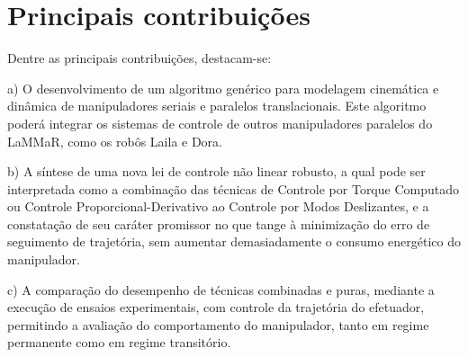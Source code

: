 \documentclass[]{politex}
\begin{document}

\section{Principais contribuições}

Dentre as principais contribuições, destacam-se:

a) O desenvolvimento de um algoritmo genérico para modelagem cinemática e dinâmica de manipuladores seriais e paralelos translacionais. Este algoritmo poderá integrar os sistemas de controle de outros manipuladores paralelos do LaMMaR, como os robôs Laila e Dora.

b) A síntese de uma nova lei de controle não linear robusto, a qual pode ser interpretada como a combinação das técnicas de Controle por Torque Computado ou Controle Proporcional-Derivativo ao Controle por Modos Deslizantes, e a constatação de seu caráter promissor no que tange à minimização do erro de seguimento de trajetória, sem aumentar demasiadamente o consumo energético do manipulador.

c) A comparação do desempenho de técnicas combinadas e puras, mediante a execução de ensaios experimentais, com controle da trajetória do efetuador, permitindo a avaliação do comportamento do manipulador, tanto em regime permanente como em regime transitório.
\end{document}
